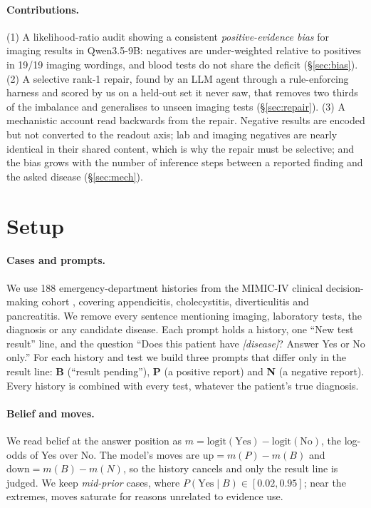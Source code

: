 \documentclass[10pt]{article}
\begin{document}
\paragraph{Contributions.}
(1) A likelihood-ratio audit showing a consistent \emph{positive-evidence bias} for imaging results in Qwen3.5-9B: negatives are under-weighted relative to positives in 19/19 imaging wordings, and blood tests do not share the deficit (\S\ref{sec:bias}).
(2) A selective rank-1 repair, found by an LLM agent through a rule-enforcing harness and scored by us on a held-out set it never saw, that removes two thirds of the imbalance and generalises to unseen imaging tests (\S\ref{sec:repair}).
(3) A mechanistic account read backwards from the repair. Negative results are encoded but not converted to the readout axis; lab and imaging negatives are nearly identical in their shared content, which is why the repair must be selective; and the bias grows with the number of inference steps between a reported finding and the asked disease (\S\ref{sec:mech}).

\section{Setup}\label{sec:setup}

\paragraph{Cases and prompts.} We use 188 emergency-department histories from the MIMIC-IV clinical decision-making cohort \citep{johnson2023mimiciv,hager2024evaluation}, covering appendicitis, cholecystitis, diverticulitis and pancreatitis. We remove every sentence mentioning imaging, laboratory tests, the diagnosis or any candidate disease. Each prompt holds a history, one ``New test result'' line, and the question ``Does this patient have \emph{[disease]}? Answer Yes or No only.'' For each history and test we build three prompts that differ only in the result line: \textbf{B} (``result pending''), \textbf{P} (a positive report) and \textbf{N} (a negative report). Every history is combined with every test, whatever the patient's true diagnosis.

\paragraph{Belief and moves.} We read belief at the answer position as $m = \mathrm{logit}(\text{Yes}) - \mathrm{logit}(\text{No})$, the log-odds of Yes over No. The model's moves are $\mathrm{up} = m(P) - m(B)$ and $\mathrm{down} = m(B) - m(N)$, so the history cancels and only the result line is judged. We keep \emph{mid-prior} cases, where $P(\text{Yes} \mid B) \in [0.02, 0.95]$; near the extremes, moves saturate for reasons unrelated to evidence use.
\end{document}
